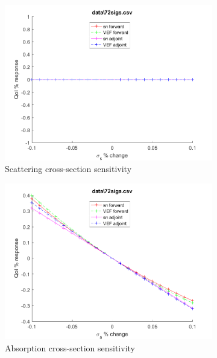 \documentclass{article}
\begin{document}
\begin{figure}[H]
\begin{subfigure}{.5\textwidth}
  \includegraphics[width=.98\linewidth]{IanProposal/figures2/72sigsSens.png}
  \caption{Scattering cross-section sensitivity}
  \label{fig:sfig2}
\end{subfigure}%
\begin{subfigure}{.5\textwidth}
  \centering
  \includegraphics[width=.98\linewidth]{IanProposal/figures2/72sigaSens.png}
  \caption{Absorption cross-section sensitivity}
  \label{fig:sfig5}
\end{subfigure}%
\caption{}
\label{fig:fig}
\end{figure}
\newpage

\end{document}
